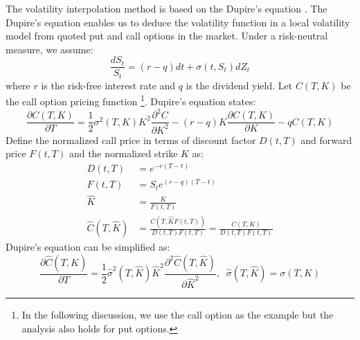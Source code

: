 \documentclass[letterpaper,12pt,titlepage,oneside,final]{book}
\numberwithin{equation}{section}
\theoremstyle{definition}
\begin{document}
The volatility interpolation method is based on the Dupire's equation \cite{dupire1994pricing}.  The Dupire's equation enables us to deduce the volatility function in a local volatility
model from quoted put and call options in the market.
Under a risk-neutral measure, we assume:
	\[
	\frac{d S_t}{ S_t}= \left(r-q\right)dt +\sigma(t,S_t) dZ_t
	\]
where $r$ is the risk-free interest rate and $q$ is the dividend yield.
 Let $C(T,K)$ be the call option pricing function \footnote{In the following discussion, we use the call option as the example but the analysis also holds for put options.}. Dupire's equation states:
	\[
	\frac{\partial C(T,K)}{\partial T}=\frac{1}{2} {\sigma}^2(T,K)K^2  \frac{\partial^2 C}{ \partial K^2}-(r-q) K\frac{\partial C(T,K)}{\partial K}-qC(T,K)
	\]
Define the normalized call price in terms of discount factor $D(t,T)$ and forward price $F(t,T)$ and the normalized strike $\widehat{K}$ as:
\[
\begin{split}
D(t,T)&=e^{-r(T-t)}\\
F(t,T)&=S_te^{(r-q)(T-t)}\\
\widehat{K}&=\frac{K}{F(t,T)}\\
\widehat{C}(T,\widehat{K})&=\frac{C(T,\widehat{K} F(t,T))}{D(t,T)F(t,T)}=\frac{C(T,K)}{D(t,T)F(t,T)}
\end{split}
\]
Dupire's equation can be simplified as:
\[
\frac{\partial \widehat{C}(T,\widehat{K})}{\partial T}=\frac{1}{2} \widehat{\sigma}^2(T,\widehat{K}) \widehat{K}^2  \frac{\partial^2 \widehat{C}(T,\widehat{K})}{ \partial \widehat{K}^2},\;\; \widehat{\sigma}(T,\widehat{K})={\sigma}(T,K)
\]
\end{document}
